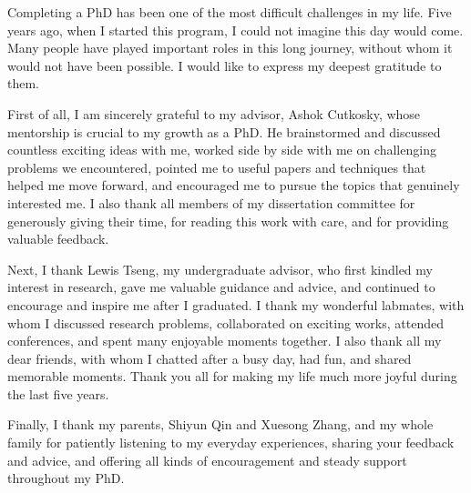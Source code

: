 Completing a PhD has been one of the most difficult challenges in my life. Five years ago, when I started this program, I could not imagine this day would come. Many people have played important roles in this long journey, without whom it would not have been possible. I would like to express my deepest gratitude to them.

First of all, I am sincerely grateful to my advisor, Ashok Cutkosky, whose mentorship is crucial to my growth as a PhD. He brainstormed and discussed countless exciting ideas with me, worked side by side with me on challenging problems we encountered, pointed me to useful papers and techniques that helped me move forward, and encouraged me to pursue the topics that genuinely interested me.
I also thank all members of my dissertation committee for generously giving their time, for reading this work with care, and for providing valuable feedback.

Next, I thank Lewis Tseng, my undergraduate advisor, who first kindled my interest in research, gave me valuable guidance and advice, and continued to encourage and inspire me after I graduated. I thank my wonderful labmates, with whom I discussed research problems, collaborated on exciting works, attended conferences, and spent many enjoyable moments together. I also thank all my dear friends, with whom I chatted after a busy day, had fun, and shared memorable moments. Thank you all for making my life much more joyful during the last five years.

Finally, I thank my parents, Shiyun Qin and Xuesong Zhang, and my whole family for patiently listening to my everyday experiences, sharing your feedback and advice, and offering all kinds of encouragement and steady support throughout my PhD.


